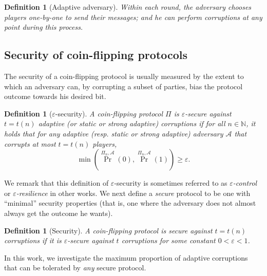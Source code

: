 \documentclass[11pt,letterpaper]{article}
\theoremstyle{plain}
\newtheorem{definition}[theorem]{Definition}
\theoremstyle{definition}
\newcommand{\NN}{\mathbb{N}}
\newcommand{\eps}{\varepsilon}
\newcommand{\Adv}{\mathcal{A}}
\begin{document}
\iffalse
\begin{definition}[Static rushing adversary]
The adversary chooses all the players that he wishes to corrupt, before the protocol starts. 
Then, within each round, the adversary sees the messages of all honest players before 
deciding the messages of the corrupt players.
\end{definition}
\fi

\begin{definition}[Adaptive adversary]
Within each round, the adversary chooses players one-by-one to send their messages; 
and he can perform corruptions at any point during this process.
\end{definition}






\subsection{Security of coin-flipping protocols}

The security of a coin-flipping protocol is usually measured by the extent to which an adversary can, by corrupting a subset of parties,
bias the protocol outcome towards his desired bit.

\begin{definition}[$\eps$-security]
A coin-flipping protocol $\Pi$ is \emph{$\eps$-secure} against $t=t(n)$ adaptive (or static or strong adaptive) 
corruptions if for all $n\in\NN$, it holds that 
for any adaptive (resp. static or strong adaptive) adversary $\Adv$ that corrupts at most $t=t(n)$ players,
$$\min\left({\Pr}^{\Pi_n,\Adv}(0),{\Pr}^{\Pi_n,\Adv}(1)\right)\geq\eps.$$
\end{definition}

We remark that this definition of $\eps$-security is sometimes referred to as \emph{$\eps$-control} or \emph{$\eps$-resilience} in other works.
We next define a \emph{secure} protocol to be one
with ``minimal'' security properties (that is, one where the adversary does not almost always get the outcome he wants).

\begin{definition}[Security]
A coin-flipping protocol is \emph{secure} against $t=t(n)$ corruptions 
if it is $\eps$-secure against $t$ corruptions for some constant $0<\eps<1$. 
\end{definition}

In this work, we investigate the maximum proportion of adaptive corruptions that can be tolerated by \emph{any} secure protocol.
\end{document}
